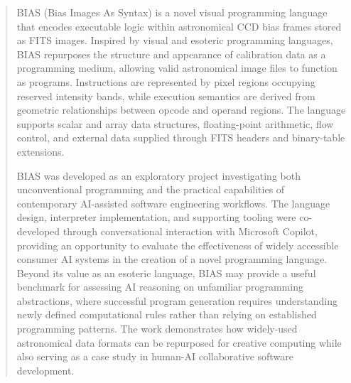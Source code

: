 \documentclass[11pt,twoside]{article}
\begin{document}
\begin{abstract}
BIAS (Bias Images As Syntax) is a novel visual programming language that encodes executable logic within astronomical CCD bias frames stored as FITS images. Inspired by visual and esoteric programming languages, BIAS repurposes the structure and appearance of calibration data as a programming medium, allowing valid astronomical image files to function as programs. Instructions are represented by pixel regions occupying reserved intensity bands, while execution semantics are derived from geometric relationships between opcode and operand regions. The language supports scalar and array data structures, floating-point arithmetic, flow control, and external data supplied through FITS headers and binary-table extensions.

BIAS was developed as an exploratory project investigating both unconventional programming and the practical capabilities of contemporary AI-assisted software engineering workflows. The language design, interpreter implementation, and supporting tooling were co-developed through conversational interaction with Microsoft Copilot, providing an opportunity to evaluate the effectiveness of widely accessible consumer AI systems in the creation of a novel programming language. Beyond its value as an esoteric language, BIAS may provide a useful benchmark for assessing AI reasoning on unfamiliar programming abstractions, where successful program generation requires understanding newly defined computational rules rather than relying on established programming patterns. The work demonstrates how widely-used astronomical data formats can be repurposed for creative computing while also serving as a case study in human-AI collaborative software development.
\end{abstract}


\end{document}
